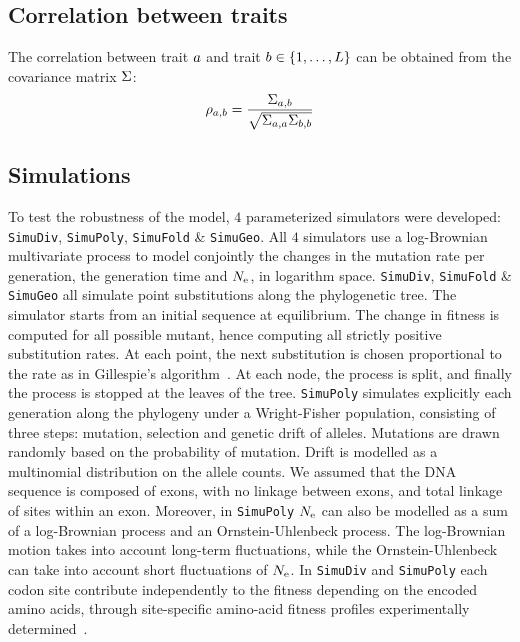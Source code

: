 \subsection{Correlation between traits}
\label{sec:Correlation}
The correlation between trait $a$ and trait $b \in \{1, \hdots, L\}$ can be obtained from the covariance matrix $\Sigma$:
\begin{equation}
    \rho_{a, b} = \dfrac{\Sigma_{a, b}}{\sqrt{\Sigma_{a, a} \Sigma_{b, b}}}
\end{equation}

\subsection{Simulations}
\label{sec:Simulation}
To test the robustness of the model, $4$ parameterized simulators were developed: \texttt{SimuDiv}, \texttt{SimuPoly}, \texttt{SimuFold} \& \texttt{SimuGeo}.
All $4$ simulators use a log-Brownian multivariate process to model conjointly the changes in the mutation rate per generation, the generation time and $N_{\text{e}}$, in logarithm space.
\texttt{SimuDiv}, \texttt{SimuFold} \& \texttt{SimuGeo} all simulate point \glspl{substitution} along the phylogenetic tree.
The simulator starts from an initial sequence at equilibrium.
The change in fitness is computed for all possible mutant, hence computing all strictly positive \gls{substitution} rates.
At each point, the next \gls{substitution} is chosen proportional to the rate as in Gillespie's algorithm~\citep{Gillespie1977}.
At each node, the process is split, and finally the process is stopped at the leaves of the tree.
\texttt{SimuPoly} simulates explicitly each generation along the phylogeny under a Wright-Fisher population, consisting of three steps: mutation, selection and \gls{genetic drift} of \glspl{allele}.
Mutations are drawn randomly based on the probability of mutation.
Drift is modelled as a multinomial distribution on the \gls{allele} counts.
We assumed that the \acrshort{DNA} sequence is composed of exons, with no linkage between exons, and total linkage of sites within an exon.
Moreover, in \texttt{SimuPoly} $N_{\text{e}}$ can also be modelled as a sum of a log-Brownian process and an Ornstein-Uhlenbeck process.
The log-Brownian motion takes into account long-term fluctuations, while the Ornstein-Uhlenbeck can take into account short fluctuations of $N_{\text{e}}$.
In \texttt{SimuDiv} and \texttt{SimuPoly} each \gls{codon} site contribute independently to the fitness depending on the encoded amino acids, through site-specific amino-acid fitness profiles experimentally determined~\citep{Bloom2017}.
